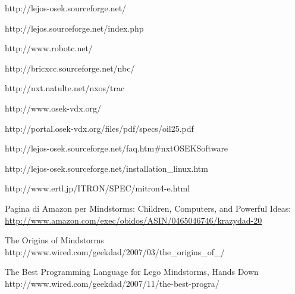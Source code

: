 \begin{thebibliography}{99}

            {http://lejos-osek.sourceforge.net/}

            {http://lejos.sourceforge.net/index.php}

            {http://www.robotc.net/}

            {http://bricxcc.sourceforge.net/nbc/}

            {http://nxt.natulte.net/nxos/trac}

            {http://www.osek-vdx.org/}

            {http://portal.osek-vdx.org/files/pdf/specs/oil25.pdf}

            {http://lejos-osek.sourceforge.net/faq.htm\#nxtOSEKSoftware}

            {http://lejos-osek.sourceforge.net/installation_linux.htm}

            {http://www.ertl.jp/ITRON/SPEC/mitron4-e.html}

    Pagina di Amazon per Mindstorms: Children, Computers, and Powerful
    Ideas: \\
    \url{http://www.amazon.com/exec/obidos/ASIN/0465046746/krazydad-20}

          {The Origins of Mindstorms}
          {http://www.wired.com/geekdad/2007/03/the_origins_of_/}

          {The Best Programming Language for Lego Mindstorms, Hands Down}
          {http://www.wired.com/geekdad/2007/11/the-best-progra/}

\end{thebibliography}
